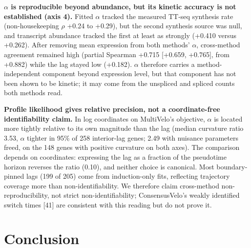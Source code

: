 \documentclass[10pt,twocolumn]{article}
\begin{document}
\textbf{$\alpha$ is reproducible beyond abundance, but its kinetic accuracy is not established (axis 4).} Fitted $\alpha$ tracked the measured TT-seq synthesis rate (non-housekeeping $\rho$ +0.24 to +0.29), but the second synthesis source was null, and transcript abundance tracked the first at least as strongly (+0.410 versus +0.262). After removing mean expression from both methods' $\alpha$, cross-method agreement remained high (partial Spearman +0.715 [+0.659, +0.765], from +0.882) while the lag stayed low (+0.182). $\alpha$ therefore carries a method-independent component beyond expression level, but that component has not been shown to be kinetic; it may come from the unspliced and spliced counts both methods read.

\textbf{Profile likelihood gives relative precision, not a coordinate-free identifiability claim.} In log coordinates on MultiVelo's objective, $\alpha$ is located more tightly relative to its own magnitude than the lag (median curvature ratio 3.53, $\alpha$ tighter in 95\% of 258 interior-lag genes; 2.49 with nuisance parameters freed, on the 148 genes with positive curvature on both axes). The comparison depends on coordinates: expressing the lag as a fraction of the pseudotime horizon reverses the ratio (0.10), and neither choice is canonical. Most boundary-pinned lags (199 of 205) come from induction-only fits, reflecting trajectory coverage more than non-identifiability. We therefore claim cross-method non-reproducibility, not strict non-identifiability; ConsensusVelo's weakly identified switch times [41] are consistent with this reading but do not prove it.

\section*{Conclusion}
\end{document}
